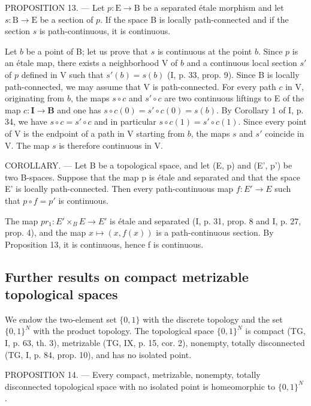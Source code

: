 PROPOSITION 13. --- Let \(p \colon \mathrm{E} \to \mathrm{B}\) be a separated étale morphism and let \(s \colon \mathrm{B} \to \mathrm{E}\) be a section of \(p\). If the space B is locally path-connected and if the section \(s\) is path-continuous, it is continuous.

Let \(b\) be a point of B; let us prove that \(s\) is continuous at the point \(b\). Since \(p\) is an étale map, there exists a neighborhood V of \(b\) and a continuous local section \(s'\) of \(p\) defined in V such that \(s'(b) = s(b)\) (I, p. 33, prop. 9). Since B is locally path-connected, we may assume that V is path-connected. For every path \(c\) in V, originating from \(b\), the maps \(s \circ c\) and \(s' \circ c\) are two continuous liftings to E of the map \(c \colon \mathbf{I} \to \mathbf{B}\) and one has \(s \circ c(0) = s' \circ c(0) = s(b)\). By Corollary 1 of I, p. 34, we have \(s \circ c = s' \circ c\) and in particular \(s \circ c(1) = s' \circ c(1)\). Since every point of V is the endpoint of a path in V starting from \(b\), the maps \(s\) and \(s'\) coincide in V. The map \(s\) is therefore continuous in V.

COROLLARY. --- Let B be a topological space, and let (E, p) and (E', p') be two B-spaces. Suppose that the map p is étale and separated and that the space E' is locally path-connected. Then every path-continuous map \(f: E' \to E\) such that \(p \circ f = p'\) is continuous.

The map \(pr_{1}: E'\times_{B} E \rightarrow E'\) is étale and separated (I, p. 31, prop. 8 and I, p. 27, prop. 4), and the map \(x \mapsto (x, f(x))\) is a path-continuous section. By Proposition 13, it is continuous, hence f is continuous.

\subsection{Further results on compact metrizable topological spaces}

We endow the two-element set \(\{0,1\}\) with the discrete topology and the set \(\{0,1\}^{N}\) with the product topology. The topological space \(\{0,1\}^{N}\) is compact (TG, I, p. 63, th. 3), metrizable (TG, IX, p. 15, cor. 2), nonempty, totally disconnected (TG, I, p. 84, prop. 10), and has no isolated point.

PROPOSITION 14. --- Every compact, metrizable, nonempty, totally disconnected topological space with no isolated point is homeomorphic to \(\{0,1\}^{N}\) .

